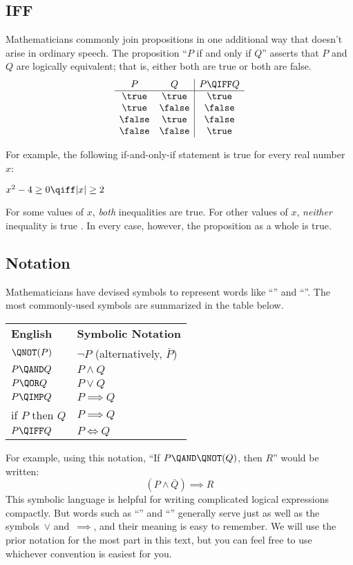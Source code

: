 \subsection{IFF}

Mathematicians commonly join propositions in one additional way that
doesn't arise in ordinary speech.  The proposition ``$P$ if and only
if $Q$'' asserts that $P$ and $Q$ are logically equivalent; that is,
either both are true or both are false.
%
\[
\begin{array}{cc|c}
P & Q & P \QIFF Q \\ \hline
\true & \true & \true \\
\true & \false & \false \\
\false & \true & \false \\
\false & \false & \true
\end{array}
\]

For example, the following if-and-only-if statement is true for every
real number $x$:
%
\begin{center}
$x^2 - 4 \geq 0 \qiff |x| \geq 2$
\end{center}
%
For some values of $x$, \textit{both} inequalities are true.  For
other values of $x$, \textit{neither} inequality is true .  In every
case, however, the proposition as a whole is true.

\subsection{Notation}

Mathematicians have devised symbols to represent words like ``\QAND''
and ``\QNOT''.  The most commonly-used symbols are summarized in the
table below.
%
\begin{center}
\begin{tabular}{ll}
\textbf{English} & \textbf{Symbolic Notation} \\[1ex]
$\QNOT(P)$ & $\neg P$ \quad (alternatively, $\bar{P}$) \\
$P \QAND Q$ & $P \land Q$ \\
$P \QOR Q$ & $P \lor Q$ \\
$P \QIMP Q$ & $P \implies Q$ \\
if $P$ then $Q$ & $P \implies Q$ \\
$P \QIFF Q$ & $P \iff Q$
\end{tabular}
\end{center}
%
For example, using this notation, ``If $P \QAND \QNOT(Q)$, then $R$''
would be written:
%
\[
    (P \land \bar{Q}) \implies R
\]
This symbolic language is helpful for writing complicated logical
expressions compactly.  But words such as ``\QOR'' and ``\QIMPLIES''
generally serve just as well as the symbols~$\lor$ and~$\implies$, and
their meaning is easy to remember.  We will use the prior notation for
the most part in this text, but you can feel free to use whichever
convention is easiest for you.

